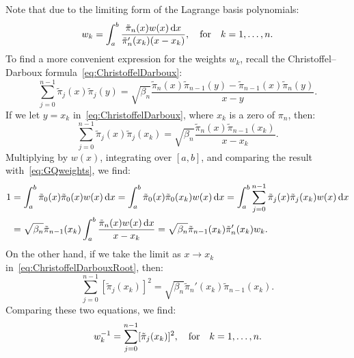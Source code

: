 \begin{remark}
Note that due to the limiting form of the Lagrange basis polynomials:
\begin{equation}\label{eq:GQweights}
w_k = \int_a^b \dfrac{\tilde{\pi}_n(x)w(x){\rm\,d} x}{\tilde{\pi}_n'(x_k)(x-x_k)},\quad{\rm for}\quad k=1,\ldots,n.
\end{equation}
To find a more convenient expression for the weights $w_k$, recall the Christoffel--Darboux formula~\eqref{eq:ChristoffelDarboux}:
\[
\sum_{j=0}^{n-1}\tilde{\pi}_j(x)\tilde{\pi}_j(y) = \sqrt{\beta_n}\dfrac{\tilde{\pi}_n(x)\tilde{\pi}_{n-1}(y) - \tilde{\pi}_{n-1}(x)\tilde{\pi}_n(y)}{x-y}.
\]
If we let $y=x_k$ in~\eqref{eq:ChristoffelDarboux}, where $x_k$ is a zero of $\pi_n$, then:
\begin{equation}\label{eq:ChristoffelDarbouxRoot}
\sum_{j=0}^{n-1}\tilde{\pi}_j(x)\tilde{\pi}_j(x_k) = \sqrt{\beta_n}\dfrac{\tilde{\pi}_n(x)\tilde{\pi}_{n-1}(x_k)}{x-x_k}.
\end{equation}
Multiplying by $w(x)$, integrating over $[a,b]$, and comparing the result with~\eqref{eq:GQweights}, we find:
\begin{align*}
1 & = \int_a^b \tilde{\pi}_0(x)\tilde{\pi}_0(x)w(x){\rm\,d} x = \int_a^b \tilde{\pi}_0(x)\tilde{\pi}_0(x_k)w(x){\rm\,d} x = \int_a^b \sum_{j=0}^{n-1}\tilde{\pi}_j(x)\tilde{\pi}_j(x_k)w(x){\rm\,d} x\\
& = \sqrt{\beta_n}\tilde{\pi}_{n-1}(x_k)\int_a^b\dfrac{\tilde{\pi}_n(x)w(x){\rm\,d} x}{x-x_k} = \sqrt{\beta_n}\tilde{\pi}_{n-1}(x_k)\tilde{\pi}_n'(x_k)w_k.
\end{align*}
On the other hand, if we take the limit as $x\to x_k$ in~\eqref{eq:ChristoffelDarbouxRoot}, then:
\begin{equation}\label{eq:ChristoffelDarbouxLimit}
\sum_{j=0}^{n-1}[\tilde{\pi}_j(x_k)]^2 = \sqrt{\beta_n}\tilde{\pi}_n'(x_k)\tilde{\pi}_{n-1}(x_k).
\end{equation}
Comparing these two equations, we find:
\begin{equation}\label{eq:GQweights2}
w_k^{-1} = \sum_{j=0}^{n-1}[\tilde{\pi}_j(x_k)]^2,\quad{\rm for}\quad k=1,\ldots,n.
\end{equation}
\end{remark}

